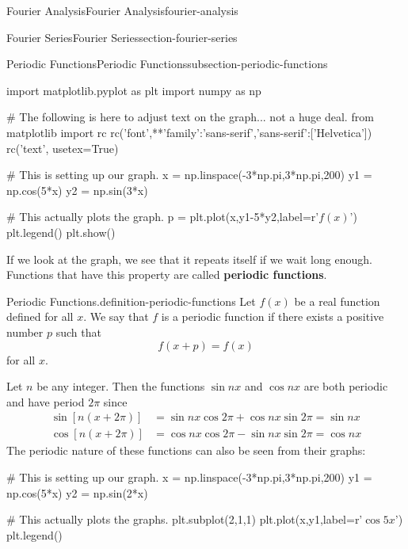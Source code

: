 \documentclass[oneside,10pt,]{book}
\newcommand{\terminology}[1]{\textbf{#1}}
\numberwithin{equation}{section}
\newcommand{\amp}{&}
\begin{document}
\begin{chapterptx}{Fourier Analysis}{}{Fourier Analysis}{}{}{fourier-analysis}
\begin{sectionptx}{Fourier Series}{}{Fourier Series}{}{}{section-fourier-series}
\begin{subsectionptx}{Periodic Functions}{}{Periodic Functions}{}{}{subsection-periodic-functions}
\begin{sageinput}
import matplotlib.pyplot as plt
import numpy as np

# The following is here to adjust text on the graph... not a huge deal.
from matplotlib import rc
rc('font',**{'family':'sans-serif','sans-serif':['Helvetica']})
rc('text', usetex=True)

# This is setting up our graph.
x = np.linspace(-3*np.pi,3*np.pi,200)
y1 = np.cos(5*x)
y2 = np.sin(3*x)

# This actually plots the graph.
p = plt.plot(x,y1-5*y2,label=r'$f(x)$')
plt.legend()
plt.show()
\end{sageinput}
\hypertarget{p-573}{}%
If we look at the graph, we see that it repeats itself if we wait long enough. Functions that have this property are called \terminology{periodic functions}.%
\begin{definition}{Periodic Functions.}{definition-periodic-functions}%
\hypertarget{p-574}{}%
Let \(f(x)\) be a real function defined for all \(x\). We say that \(f\) is a periodic function if there exists a positive number \(p\) such that%
\begin{equation*}
f(x+p) = f(x)
\end{equation*}
for all \(x\).%
\end{definition}
 \hypertarget{p-575}{}%
Let \(n\) be any integer. Then the functions \(\sin nx\) and \(\cos nx\) are both periodic and have period \(2\pi\) since%
\begin{align*}
\sin[n(x+2\pi)] \amp = \sin nx\cos2\pi + \cos nx\sin2\pi = \sin nx \\
\cos[n(x+2\pi)] \amp = \cos nx\cos2\pi - \sin nx\sin2\pi = \cos nx 
\end{align*}
The periodic nature of these functions can also be seen from their graphs:%
 \begin{sageinput}
# This is setting up our graph.
x = np.linspace(-3*np.pi,3*np.pi,200)
y1 = np.cos(5*x)
y2 = np.sin(2*x)

# This actually plots the graphs.
plt.subplot(2,1,1)
plt.plot(x,y1,label=r'$\cos5x$')
plt.legend()


\end{sageinput}
\end{subsectionptx}
\end{sectionptx}
\end{chapterptx}
\end{document}
